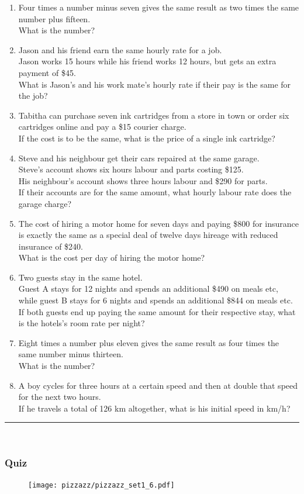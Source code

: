 \documentclass[a4paper,12pt]{article}
\newcommand\questionend{
	\rule[0pt]{17cm}{0.5pt}\vspace{0.0cm}\\
}
\newcommand\quiz{
\subsubsection{Quiz}\vspace{-0.5cm}
}
\begin{document}
\begin{enumerate}[label=\normalsize \alph*)~~~]
\item Four times a number minus seven gives the same result as two times the same number plus fifteen. \\
What is the number?
\item Jason and his friend earn the same hourly rate for a job. \\
Jason works 15 hours while his friend works 12 hours, but gets an extra payment of \$45.\\
 What is Jason’s and his work mate's hourly rate if their pay is the same for the job?
\item Tabitha can purchase seven ink cartridges from a store in town or order six cartridges online and pay a \$15 courier charge.\\
 If the cost is to be the same, what is the price of a single ink cartridge?
\item Steve and his neighbour get their cars repaired at the same garage.\\
 Steve’s account shows six hours labour and parts costing \$125.\\
 His neighbour’s account shows three hours labour and \$290 for parts.\\
 If their accounts are for the same amount, what hourly labour rate does the garage charge? 
\item The cost of hiring a motor home for seven days and paying \$800 for insurance is exactly the same as a special deal of twelve days hireage with reduced insurance of \$240. \\
What is the cost per day of hiring the motor home?
\item Two guests stay in the same hotel.\\
 Guest A stays for 12 nights and spends an additional \$490 on meals etc, while guest B stays for 6 nights and spends an additional \$844 on meals etc.\\
 If both guests end up paying the same amount for their respective stay, what is the hotels’s room rate per night?
\item Eight times a number plus eleven gives the same result as four times the same number minus thirteen. \\
What is the number?
\item A boy cycles for three hours at a certain speed and then at double that speed for the next two hours. \\
If he travels a total of 126 km altogether, what is his initial speed in km/h?
\end{enumerate}
\questionend
\newpage
\quiz
\begin{figure}[!h]
	\centering
	\texttt{[image: pizzazz/pizzazz\_set1\_6.pdf]}
\end{figure}
\newpage
\end{document}
